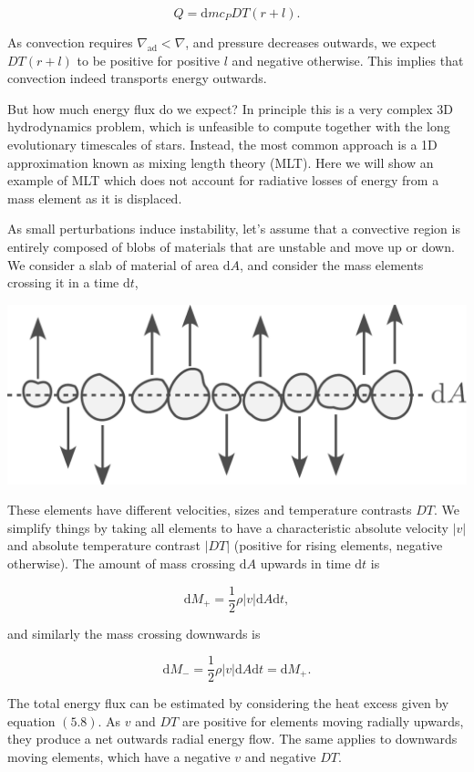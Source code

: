 \documentclass[twocolumn]{article}
\begin{document}
\[Q = \mathrm{d}m c_P DT(r+l).\tag{5.8}\]

As convection requires \(\nabla_\mathrm{ad}<\nabla\), and pressure
decreases outwards, we expect \(DT(r+l)\) to be positive for positive
\(l\) and negative otherwise. This implies that convection indeed
transports energy outwards.

But how much energy flux do we expect? In principle this is a very
complex 3D hydrodynamics problem, which is unfeasible to compute
together with the long evolutionary timescales of stars. Instead, the
most common approach is a 1D approximation known as mixing length theory
(MLT). Here we will show an example of MLT which does not account for
radiative losses of energy from a mass element as it is displaced.

As small perturbations induce instability, let's assume that a
convective region is entirely composed of blobs of materials that are
unstable and move up or down. We consider a slab of material of area
\(\mathrm{d}A\), and consider the mass elements crossing it in a time
\(\mathrm{d}t\),

\includegraphics{../assets/6_convection/blobs.pdf}

These elements have different velocities, sizes and temperature
contrasts \(DT\). We simplify things by taking all elements to have a
characteristic absolute velocity \(|v|\) and absolute temperature
contrast \(|DT|\) (positive for rising elements, negative otherwise).
The amount of mass crossing \(\mathrm{d}A\) upwards in time
\(\mathrm{d}t\) is

\[\mathrm{d}M_+=\frac{1}{2}\rho|v|\mathrm{d}A\mathrm{d}t,\]

and similarly the mass crossing downwards is

\[\mathrm{d}M_-=\frac{1}{2}\rho|v|\mathrm{d}A\mathrm{d}t=\mathrm{d}M_+.\]

The total energy flux can be estimated by considering the heat excess
given by equation \((5.8)\). As \(v\) and \(DT\) are positive for
elements moving radially upwards, they produce a net outwards radial
energy flow. The same applies to downwards moving elements, which have a
negative \(v\) and negative \(DT\).
\end{document}
